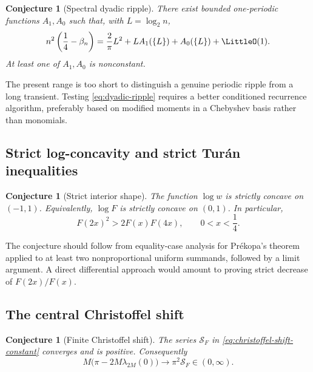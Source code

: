\documentclass[11pt,oneside]{article}
\newtheorem{conjecture}[theorem]{Conjecture}
\theoremstyle{definition}
\theoremstyle{remark}
\numberwithin{equation}{section}
\begin{document}
\begin{conjecture}[Spectral dyadic ripple]
\label{conj:dyadic-ripple}
There exist bounded one-periodic functions $A_1,A_0$ such that, with
$L=\log_2n$,
\begin{equation}
 n^2\left(\frac14-\beta_n\right)
 =\frac{2}{\pi}L^2+L A_1(\{L\})+A_0(\{L\})+\LittleO(1).
 \label{eq:dyadic-ripple}
\end{equation}
At least one of $A_1,A_0$ is nonconstant.
\end{conjecture}

The present range is too short to distinguish a genuine periodic ripple from
a long transient.  Testing \cref{eq:dyadic-ripple} requires a better
conditioned recurrence algorithm, preferably based on modified moments in a
Chebyshev basis rather than monomials.

\subsection{Strict log-concavity and strict Tur\'an inequalities}

\begin{conjecture}[Strict interior shape]
\label{conj:strict-logconcavity}
The function $\log w$ is strictly concave on $(-1,1)$.  Equivalently,
$\log F$ is strictly concave on $(0,1)$.  In particular,
\begin{equation}
 F(2x)^2>2F(x)F(4x),
 \qquad 0<x<\frac14.
 \label{eq:strict-turan-conjecture}
\end{equation}
\end{conjecture}

The conjecture should follow from equality-case analysis for Pr\'ekopa's
theorem applied to at least two nonproportional uniform summands, followed by
a limit argument.  A direct differential approach would amount to proving
strict decrease of $F(2x)/F(x)$.

\subsection{The central Christoffel shift}

\begin{conjecture}[Finite Christoffel shift]
\label{conj:christoffel-shift}
The series $\mathcal S_F$ in \cref{eq:christoffel-shift-constant} converges and
is positive.  Consequently
\begin{equation}
 M\bigl(\pi-2M\lambda_{2M}(0)\bigr)
 \longrightarrow \pi^2\mathcal S_F\in(0,\infty).
 \label{eq:christoffel-shift-conjecture}
\end{equation}
\end{conjecture}
\end{document}
